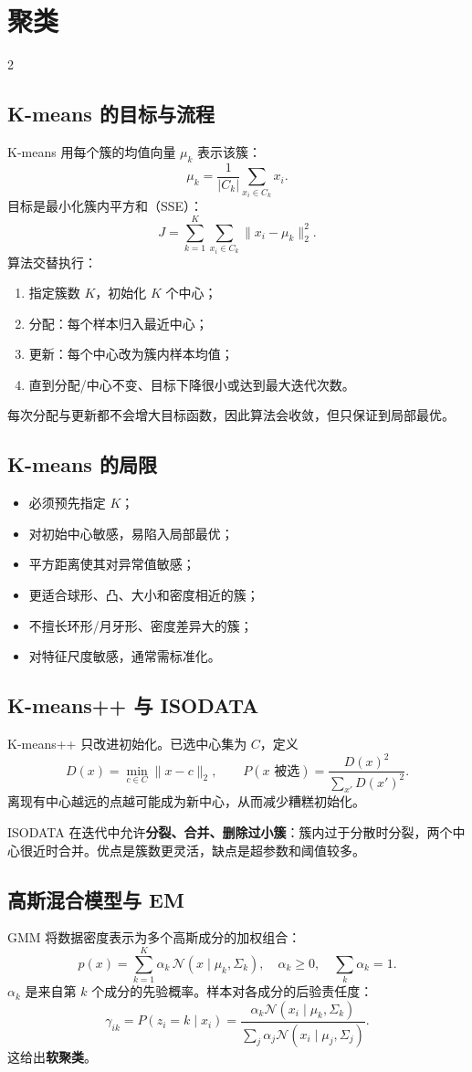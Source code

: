 \documentclass[9pt,a4paper,UTF8]{ctexart}
\begin{document}
\section{聚类}
\begin{multicols}{2}
\subsection{K-means 的目标与流程}
K-means 用每个簇的均值向量 $\mu_k$ 表示该簇：
\[
\mu_k=\frac1{|C_k|}\sum_{x_i\in C_k}x_i.
\]
目标是最小化簇内平方和（SSE）：
\[
J=\sum_{k=1}^{K}\sum_{x_i\in C_k}\|x_i-\mu_k\|_2^2.
\]
算法交替执行：
\begin{enumerate}
\item 指定簇数 $K$，初始化 $K$ 个中心；
\item 分配：每个样本归入最近中心；
\item 更新：每个中心改为簇内样本均值；
\item 直到分配/中心不变、目标下降很小或达到最大迭代次数。
\end{enumerate}
每次分配与更新都不会增大目标函数，因此算法会收敛，但只保证到局部最优。

\subsection{K-means 的局限}
\begin{itemize}
\item 必须预先指定 $K$；
\item 对初始中心敏感，易陷入局部最优；
\item 平方距离使其对异常值敏感；
\item 更适合球形、凸、大小和密度相近的簇；
\item 不擅长环形/月牙形、密度差异大的簇；
\item 对特征尺度敏感，通常需标准化。
\end{itemize}

\subsection{K-means++ 与 ISODATA}
K-means++ 只改进初始化。已选中心集为 $C$，定义
\[
D(x)=\min_{c\in C}\|x-c\|_2,
\qquad
P(x\text{ 被选})=\frac{D(x)^2}{\sum_{x'}D(x')^2}.
\]
离现有中心越远的点越可能成为新中心，从而减少糟糕初始化。

ISODATA 在迭代中允许\textbf{分裂、合并、删除过小簇}：簇内过于分散时分裂，两个中心很近时合并。优点是簇数更灵活，缺点是超参数和阈值较多。

\subsection{高斯混合模型与 EM}
GMM 将数据密度表示为多个高斯成分的加权组合：
\[
p(x)=\sum_{k=1}^{K}\alpha_k\,\mathcal N(x\mid\mu_k,\Sigma_k),
\quad \alpha_k\ge0,\quad\sum_k\alpha_k=1.
\]
$\alpha_k$ 是来自第 $k$ 个成分的先验概率。样本对各成分的后验责任度：
\[
\gamma_{ik}=P(z_i=k\mid x_i)=
\frac{\alpha_k\mathcal N(x_i\mid\mu_k,\Sigma_k)}{\sum_j\alpha_j\mathcal N(x_i\mid\mu_j,\Sigma_j)}.
\]
这给出\textbf{软聚类}。


\end{multicols}
\end{document}
